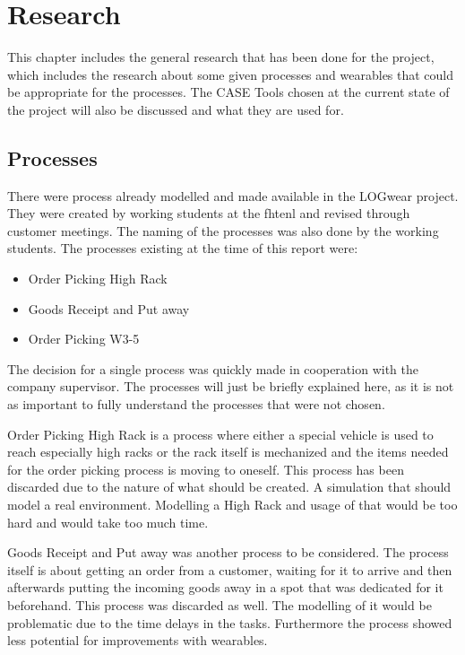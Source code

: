 \chapter{Research}\label{cha:research}
This chapter includes the general research that has been done for the project, which includes the research about some given processes and wearables that could be appropriate for the processes. The CASE Tools chosen at the current state of the project will also be discussed and what they are used for.

\section{Processes}\label{sec:processes}
There were process already modelled and made available in the LOGwear project. They were created by working students at the \gls{fhtenl} and revised through customer meetings. The naming of the processes was also done by the working students. The processes existing at the time of this report were:

\begin{itemize}
	\item Order Picking High Rack
	\item Goods Receipt and Put away
	\item Order Picking W3-5
\end{itemize}

The decision for a single process was quickly made in cooperation with the company supervisor. The processes will just be briefly explained here, as it is not as important to fully understand the processes that were not chosen.

Order Picking High Rack is a process where either a special vehicle is used to reach especially high racks or the rack itself is mechanized and the items needed for the order picking process is moving to oneself. This process has been discarded due to the nature of what should be created. A simulation that should model a real environment. Modelling a High Rack and usage of that would be too hard and would take too much time.

Goods Receipt and Put away was another process to be considered. The process itself is about getting an order from a customer, waiting for it to arrive and then afterwards putting the incoming goods away in a spot that was dedicated for it beforehand. This process was discarded as well. The modelling of it would be problematic due to the time delays in the tasks. Furthermore the process showed less potential for improvements with wearables.

